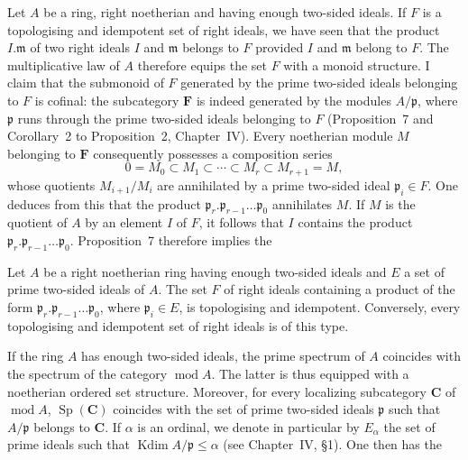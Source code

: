 Let $A$ be a ring, right noetherian and having enough two-sided ideals.
If $F$ is a topologising and idempotent set of right ideals, we have
seen that the product $I.\mathfrak{m}$ of two right ideals $I$ and
$\mathfrak{m}$ belongs to $F$ provided $I$ and $\mathfrak{m}$ belong to
$F$. The multiplicative law of $A$ therefore equips the set $F$ with a
monoid structure. I claim that the submonoid of $F$ generated by the
prime two-sided ideals belonging to $F$ is cofinal: the subcategory
$\mathbf{F}$ is indeed generated by the modules $A/\mathfrak{p}$, where
$\mathfrak{p}$ runs through the prime two-sided ideals belonging to $F$
(Proposition~7 and Corollary~2 to Proposition~2, Chapter~IV). Every
noetherian module $M$ belonging to $\mathbf{F}$ consequently possesses a
composition series
\[
0 = M_0 \subset M_1 \subset \cdots \subset M_r \subset M_{r+1} = M,
\]
whose quotients $M_{i+1}/M_i$ are annihilated by a prime two-sided ideal
$\mathfrak{p}_i \in F$. One deduces from this that the product
$\mathfrak{p}_r.\mathfrak{p}_{r-1}\ldots\mathfrak{p}_0$ annihilates $M$.
If $M$ is the quotient of $A$ by an element $I$ of $F$, it follows that
$I$ contains the product
$\mathfrak{p}_r.\mathfrak{p}_{r-1}\ldots\mathfrak{p}_0$. Proposition~7
therefore implies the

\begin{corollary}
Let $A$ be a right noetherian ring having enough two-sided ideals and
$E$ a set of prime two-sided ideals of $A$. The set $F$ of right ideals
containing a product of the form
$\mathfrak{p}_r.\mathfrak{p}_{r-1}\ldots\mathfrak{p}_0$, where
$\mathfrak{p}_i \in E$, is topologising and idempotent. Conversely,
every topologising and idempotent set of right ideals is of this type.
\end{corollary}

If the ring $A$ has enough two-sided ideals, the prime spectrum of $A$
coincides with the spectrum of the category $\operatorname{mod} A$. The
latter is thus equipped with a noetherian ordered set structure.
Moreover, for every localizing subcategory $\mathbf{C}$ of
$\operatorname{mod} A$, $\operatorname{Sp}(\mathbf{C})$ coincides with the
set of prime two-sided ideals $\mathfrak{p}$ such that $A/\mathfrak{p}$
belongs to $\mathbf{C}$. If $\alpha$ is an ordinal, we denote in
particular by $E_\alpha$ the set of prime ideals such that
$\operatorname{Kdim} A/\mathfrak{p} \le \alpha$ (see Chapter~IV, \S1).
One then has the

